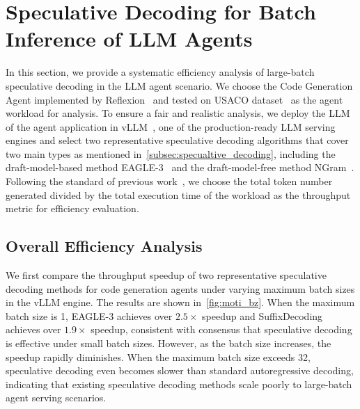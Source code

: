 \section{Speculative Decoding for Batch Inference of LLM Agents}
\label{sec:bottleneck}
In this section, we provide a systematic efficiency analysis of large-batch speculative decoding in the LLM agent scenario. We choose the Code Generation Agent implemented by Reflexion~\citep{DBLP:conf/nips/ShinnCGNY23} and tested on USACO dataset~\citep{DBLP:journals/corr/abs-2404-10952} as the agent workload for analysis. To ensure a fair and realistic analysis, we deploy the LLM of the agent application in vLLM~\citep{DBLP:conf/sosp/KwonLZ0ZY0ZS23}, one of the production-ready LLM serving engines and select two representative speculative decoding algorithms that cover two main types as mentioned in~\cref{subsec:specualtive_decoding}, including the draft-model-based method EAGLE-3~\citep{DBLP:journals/corr/abs-2503-01840} and the draft-model-free method NGram~\citep{saxena2023prompt}. Following the standard of previous work~\citep{DBLP:conf/sosp/KwonLZ0ZY0ZS23}, we choose the total token number generated divided by the total execution time of the workload as the throughput metric for efficiency evaluation.

\subsection{Overall Efficiency Analysis} We first compare the throughput speedup of two representative speculative decoding methods for code generation agents under varying maximum batch sizes in the vLLM engine. The results are shown in~\cref{fig:moti_bz}. When the maximum batch size is 1, EAGLE-3 achieves over $2.5\times$ speedup and SuffixDecoding achieves over $1.9\times$ speedup, consistent with consensus that speculative decoding is effective under small batch sizes. However, as the batch size increases, the speedup rapidly diminishes. When the maximum batch size exceeds 32, speculative decoding even becomes slower than standard autoregressive decoding, indicating that existing speculative decoding methods scale poorly to large-batch agent serving scenarios.

